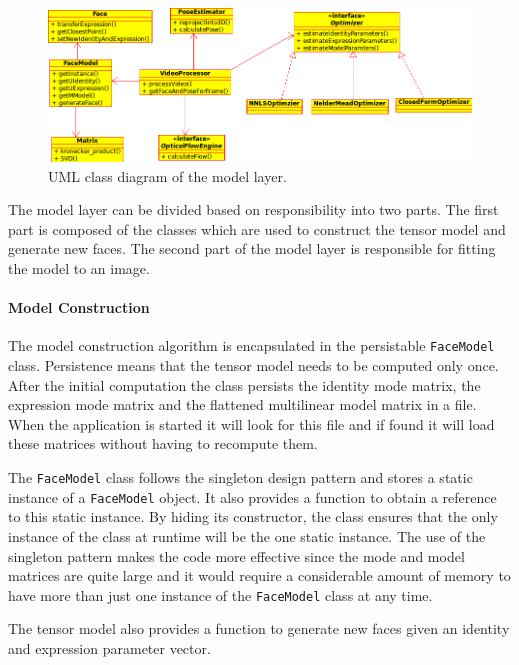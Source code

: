 \documentclass[11pt,a4paper,twoside]{report}
\begin{document}
\begin{figure}[H]
\begin{centering}
\includegraphics[scale=0.67]{images/modellayer.png}
\par\end{centering}

\caption{UML class diagram of the model layer.}
\label{fg:modellayer}
\end{figure}

The model layer can be divided based on responsibility into two parts. The first
part is composed of the classes which are used to construct the tensor
model and generate new faces. The second part of the model layer is responsible for fitting the model
to an image.

\paragraph{Model Construction}
The model construction algorithm is encapsulated in the persistable \texttt{FaceModel}
class. Persistence means that the tensor model needs to be computed only once. After
the initial computation the class persists the identity mode
matrix, the expression mode matrix and the flattened multilinear model matrix in
a file. When the application is started it will look for this file and if found
it will load these matrices without having to recompute them. 

The \texttt{FaceModel} class follows the singleton design pattern and stores a static instance of a
\texttt{FaceModel} object. It also provides a function to obtain a reference to
this static instance. By hiding its constructor, the class ensures that the only instance of the
class at runtime will be the one static instance. The use of the singleton
pattern makes the code more effective since the mode and model matrices are
quite large and it would require a considerable amount of memory to have more than just one
instance of the \texttt{FaceModel} class at any time.

The tensor model also provides a function to generate new faces given an identity
and expression parameter vector. 
\end{document}
